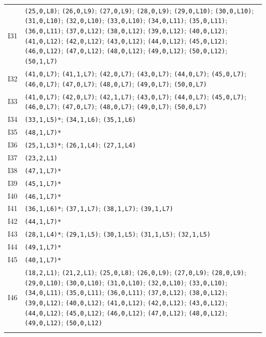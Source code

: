 {\begin{longtable}{@{}r p{14.7cm}@{}}
I31 & \texttt{(25,0,L8)}; \texttt{(26,0,L9)}; \texttt{(27,0,L9)}; \texttt{(28,0,L9)}; \texttt{(29,0,L10)}; \texttt{(30,0,L10)}; \texttt{(31,0,L10)}; \texttt{(32,0,L10)}; \texttt{(33,0,L10)}; \texttt{(34,0,L11)}; \texttt{(35,0,L11)}; \texttt{(36,0,L11)}; \texttt{(37,0,L12)}; \texttt{(38,0,L12)}; \texttt{(39,0,L12)}; \texttt{(40,0,L12)}; \texttt{(41,0,L12)}; \texttt{(42,0,L12)}; \texttt{(43,0,L12)}; \texttt{(44,0,L12)}; \texttt{(45,0,L12)}; \texttt{(46,0,L12)}; \texttt{(47,0,L12)}; \texttt{(48,0,L12)}; \texttt{(49,0,L12)}; \texttt{(50,0,L12)}; \texttt{(50,1,L7)}\\\addlinespace[3pt]
I32 & \texttt{(41,0,L7)}; \texttt{(41,1,L7)}; \texttt{(42,0,L7)}; \texttt{(43,0,L7)}; \texttt{(44,0,L7)}; \texttt{(45,0,L7)}; \texttt{(46,0,L7)}; \texttt{(47,0,L7)}; \texttt{(48,0,L7)}; \texttt{(49,0,L7)}; \texttt{(50,0,L7)}\\\addlinespace[3pt]
I33 & \texttt{(41,0,L7)}; \texttt{(42,0,L7)}; \texttt{(42,1,L7)}; \texttt{(43,0,L7)}; \texttt{(44,0,L7)}; \texttt{(45,0,L7)}; \texttt{(46,0,L7)}; \texttt{(47,0,L7)}; \texttt{(48,0,L7)}; \texttt{(49,0,L7)}; \texttt{(50,0,L7)}\\\addlinespace[3pt]
I34 & \texttt{(33,1,L5)*}; \texttt{(34,1,L6)}; \texttt{(35,1,L6)}\\\addlinespace[3pt]
I35 & \texttt{(48,1,L7)*}\\\addlinespace[3pt]
I36 & \texttt{(25,1,L3)*}; \texttt{(26,1,L4)}; \texttt{(27,1,L4)}\\\addlinespace[3pt]
I37 & \texttt{(23,2,L1)}\\\addlinespace[3pt]
I38 & \texttt{(47,1,L7)*}\\\addlinespace[3pt]
I39 & \texttt{(45,1,L7)*}\\\addlinespace[3pt]
I40 & \texttt{(46,1,L7)*}\\\addlinespace[3pt]
I41 & \texttt{(36,1,L6)*}; \texttt{(37,1,L7)}; \texttt{(38,1,L7)}; \texttt{(39,1,L7)}\\\addlinespace[3pt]
I42 & \texttt{(44,1,L7)*}\\\addlinespace[3pt]
I43 & \texttt{(28,1,L4)*}; \texttt{(29,1,L5)}; \texttt{(30,1,L5)}; \texttt{(31,1,L5)}; \texttt{(32,1,L5)}\\\addlinespace[3pt]
I44 & \texttt{(49,1,L7)*}\\\addlinespace[3pt]
I45 & \texttt{(40,1,L7)*}\\\addlinespace[3pt]
I46 & \texttt{(18,2,L1)}; \texttt{(21,2,L1)}; \texttt{(25,0,L8)}; \texttt{(26,0,L9)}; \texttt{(27,0,L9)}; \texttt{(28,0,L9)}; \texttt{(29,0,L10)}; \texttt{(30,0,L10)}; \texttt{(31,0,L10)}; \texttt{(32,0,L10)}; \texttt{(33,0,L10)}; \texttt{(34,0,L11)}; \texttt{(35,0,L11)}; \texttt{(36,0,L11)}; \texttt{(37,0,L12)}; \texttt{(38,0,L12)}; \texttt{(39,0,L12)}; \texttt{(40,0,L12)}; \texttt{(41,0,L12)}; \texttt{(42,0,L12)}; \texttt{(43,0,L12)}; \texttt{(44,0,L12)}; \texttt{(45,0,L12)}; \texttt{(46,0,L12)}; \texttt{(47,0,L12)}; \texttt{(48,0,L12)}; \texttt{(49,0,L12)}; \texttt{(50,0,L12)}\\\addlinespace[3pt]

\end{longtable}}
